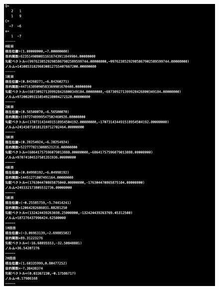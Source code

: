 \documentclass[12pt]{jarticle}
\begin{document}
\clearpage
\begin{figure}[h]
    \begin{center}
        \includegraphics[scale=0.2]{kadai1_1s_out3_3_1.png}
    \end{center}
    \begin{minipage}{0.5\hsize}
        \begin{center}

\end{center}
\end{minipage}
\end{figure}
\end{document}
